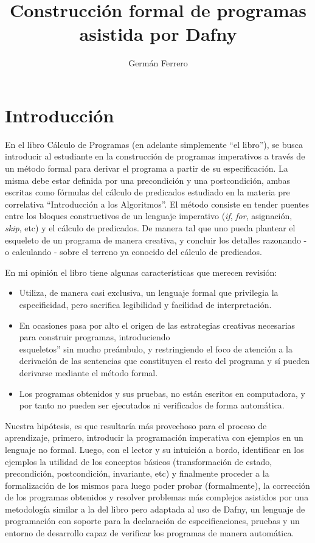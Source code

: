 \documentclass[11pt, a4paper, openany]{book}
\author{Germán Ferrero}
\title{Construcción formal de programas asistida por Dafny}
\begin{document}
    \chapter{Introducción}
    En el libro Cálculo de Programas (en adelante simplemente ``el libro''), se busca introducir al estudiante en la construcción de programas imperativos a través de un método formal para derivar el programa a partir de su especificación. La misma debe estar definida por una precondición y una postcondición, ambas escritas como fórmulas del cálculo de predicados estudiado en la materia pre correlativa ``Introducción a los Algoritmos''. El método consiste en tender puentes entre los bloques constructivos de un lenguaje imperativo (\textit{if}, \textit{for}, asignación, \textit{skip}, etc) y el cálculo de predicados. De manera tal que uno pueda plantear el esqueleto de un programa de manera creativa, y concluir los detalles razonando - o calculando - sobre el terreno ya conocido del cálculo de predicados.

    En mi opinión el libro tiene algunas características que merecen revisión:
    \begin{itemize}
    \item Utiliza, de manera casi exclusiva, un lenguaje formal que privilegia la especificidad, pero sacrifica legibilidad y facilidad de interpretación.
    \item En ocasiones pasa por alto el origen de las estrategias creativas necesarias para construir programas, introduciendo \\esqueletos'' sin mucho preámbulo, y restringiendo el foco de atención a la derivación de las sentencias que constituyen el resto del programa y sí pueden derivarse mediante el método formal.
    \item Los programas obtenidos y sus pruebas, no están escritos en computadora, y por tanto no pueden ser ejecutados ni verificados de forma automática.
    \end{itemize}

    Nuestra hipótesis, es que resultaría más provechoso para el proceso de aprendizaje, primero, introducir la programación imperativa con ejemplos en un lenguaje no formal. Luego, con el lector y su intuición a bordo, identificar en los ejemplos la utilidad de los conceptos básicos (transformación de estado, precondición, postcondición, invariante, etc) y finalmente proceder a la formalización de los mismos para luego poder probar (formalmente), la corrección de los programas obtenidos y resolver problemas más complejos asistidos por una metodología similar a la del libro pero adaptada al uso de Dafny, un lenguaje de programación con soporte para la declaración de especificaciones, pruebas y un entorno de desarrollo capaz de verificar los programas de manera automática.
\end{document}
